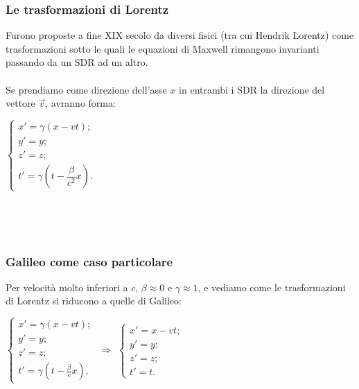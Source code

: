 \documentclass[]{beamer}
\theoremstyle{plain}
\begin{document}
\begin{frame}
  \frametitle{Le trasformazioni di Lorentz}
Furono proposte a fine XIX secolo da diversi fisici (tra cui Hendrik Lorentz) come trasformazioni sotto le quali le equazioni di Maxwell rimangono invarianti passando da un SDR ad un altro.\\~\pause\\
Se prendiamo come direzione dell'asse $ x $ in entrambi i SDR la direzione del vettore $ \vec{v} $, avranno forma:

\begin{center}
\colorbox{blue!30}{$ \left\{ 
  \begin{array}{l}
  x' = \gamma (x - vt);\\
  y'=y;\\
  z'=z;\\
  t' = \gamma \left( t - \dfrac{\beta}{c^2}x \right).
  \end{array}
  \right.   $}

~
  
~

\href{https://www.youtube.com/watch?v=Rh0pYtQG5wI}{}
\end{center}

\end{frame}


\begin{frame}
  \frametitle{Galileo come caso particolare}
  Per velocità molto inferiori a $ c $, \alert{$ \beta \approx 0 $} e \alert{$ \gamma\approx 1 $}, e vediamo come le trasformazioni di Lorentz si riducono a quelle di Galileo:
  \begin{center}
$ \left\{ 
  \begin{array}{l}
  x' = \gamma (x - vt);\\
  y'=y;\\
  z'=z;\\
  t' = \gamma \left( t - \frac{\beta}{c}x \right).
  \end{array}
  \right.   $
  $ \Longrightarrow  $
  $ \left\{ 
  \begin{array}{l}
  x' = x - vt;\\
  y'=y;\\
  z'=z;\\
  t' = t.
  \end{array}
  \right. $
\end{center}
\end{frame}
\end{document}
